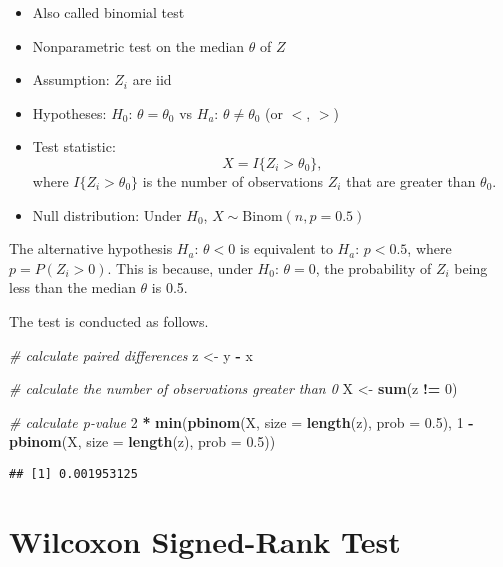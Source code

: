 \documentclass[
]{book}
\newenvironment{Shaded}{\begin{snugshade}}{\end{snugshade}}
\newcommand{\CommentTok}[1]{\textcolor[rgb]{0.56,0.35,0.01}{\textit{#1}}}
\newcommand{\DataTypeTok}[1]{\textcolor[rgb]{0.13,0.29,0.53}{#1}}
\newcommand{\DecValTok}[1]{\textcolor[rgb]{0.00,0.00,0.81}{#1}}
\newcommand{\FloatTok}[1]{\textcolor[rgb]{0.00,0.00,0.81}{#1}}
\newcommand{\KeywordTok}[1]{\textcolor[rgb]{0.13,0.29,0.53}{\textbf{#1}}}
\newcommand{\NormalTok}[1]{#1}
\newcommand{\OperatorTok}[1]{\textcolor[rgb]{0.81,0.36,0.00}{\textbf{#1}}}
\newcommand{\StringTok}[1]{\textcolor[rgb]{0.31,0.60,0.02}{#1}}
\providecommand{\tightlist}{%
  \setlength{\itemsep}{0pt}\setlength{\parskip}{0pt}}
\begin{document}
\begin{itemize}
\tightlist
\item
  Also called binomial test
\item
  Nonparametric test on the median \(\theta\) of \(Z\)
\item
  Assumption: \(Z_i\) are iid
\item
  Hypotheses: \(H_0\): \(\theta = \theta_0\) vs \(H_a\): \(\theta \neq \theta_0\) (or \(<\), \(>\))
\item
  Test statistic: \[X = I\{Z_i > \theta_0\},\]
  where \(I\{Z_i > \theta_0\}\) is the number of observations \(Z_i\) that are greater than \(\theta_0\).
\item
  Null distribution: Under \(H_0\), \(X \sim \mathrm{Binom}(n, p = 0.5)\)
\end{itemize}

The alternative hypothesis \(H_a\): \(\theta < 0\)
is equivalent to \(H_a\): \(p < 0.5\), where \(p = P(Z_i > 0)\).
This is because, under \(H_0\): \(\theta = 0\), the probability of \(Z_i\) being less than the
median \(\theta\) is 0.5.

The test is conducted as follows.

\begin{Shaded}
\begin{Highlighting}[]
\CommentTok{# calculate paired differences}
\NormalTok{z <-}\StringTok{ }\NormalTok{y }\OperatorTok{-}\StringTok{ }\NormalTok{x}

\CommentTok{# calculate the number of observations greater than 0}
\NormalTok{X <-}\StringTok{ }\KeywordTok{sum}\NormalTok{(z }\OperatorTok{!=}\StringTok{ }\DecValTok{0}\NormalTok{)}

\CommentTok{# calculate p-value}
\DecValTok{2} \OperatorTok{*}\StringTok{ }\KeywordTok{min}\NormalTok{(}\KeywordTok{pbinom}\NormalTok{(X, }\DataTypeTok{size =} \KeywordTok{length}\NormalTok{(z), }\DataTypeTok{prob =} \FloatTok{0.5}\NormalTok{),}
        \DecValTok{1} \OperatorTok{-}\StringTok{ }\KeywordTok{pbinom}\NormalTok{(X, }\DataTypeTok{size =} \KeywordTok{length}\NormalTok{(z), }\DataTypeTok{prob =} \FloatTok{0.5}\NormalTok{))}
\end{Highlighting}
\end{Shaded}

\begin{verbatim}
## [1] 0.001953125
\end{verbatim}

\hypertarget{wilcoxon-signed-rank-test}{%
\section{Wilcoxon Signed-Rank Test}\label{wilcoxon-signed-rank-test}}
\end{document}
